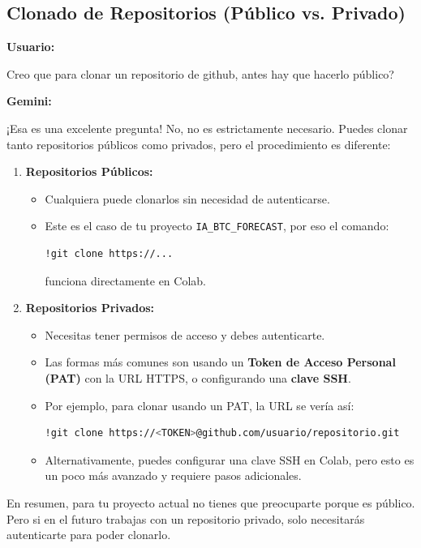 \documentclass[12pt, a4paper]{article}
\newenvironment{usuario}{\par\noindent\textbf{Usuario:}\itshape\par\ignorespaces}{\par}
\newenvironment{gemini}{\par\noindent\textbf{Gemini:}\par\ignorespaces}{\par}
\begin{document}
\subsection{Clonado de Repositorios (Público vs. Privado)}

\begin{usuario}
Creo que para clonar un repositorio de github, antes hay que 
hacerlo público?
\end{usuario}

\begin{gemini}
¡Esa es una excelente pregunta! No, no es estrictamente 
necesario. Puedes clonar tanto repositorios públicos como 
privados, pero el procedimiento es diferente:

\begin{enumerate}
    \item \textbf{Repositorios Públicos:}
    \begin{itemize}
        \item Cualquiera puede clonarlos sin necesidad de autenticarse.
        \item Este es el caso de tu proyecto \texttt{IA\_BTC\_FORECAST}, por eso el comando:
        \begin{lstlisting}[language=bash] !git clone https://...
        \end{lstlisting}
        funciona directamente en Colab.
    \end{itemize}

    \item \textbf{Repositorios Privados:}
    \begin{itemize}
        \item Necesitas tener permisos de acceso y debes autenticarte.
        \item Las formas más comunes son usando un \textbf{Token de Acceso Personal (PAT)} con la URL HTTPS, o configurando una 
        \textbf{clave SSH}.
        \item Por ejemplo, para clonar usando un PAT, la URL se vería así:
        \begin{lstlisting}[language=bash]
!git clone https://<TOKEN>@github.com/usuario/repositorio.git
        \end{lstlisting}
        \item Alternativamente, puedes configurar una clave SSH en Colab, pero esto es un poco más avanzado y requiere pasos 
        adicionales.
    \end{itemize}
\end{enumerate}

En resumen, para tu proyecto actual no tienes que preocuparte porque es público. Pero si en el futuro trabajas con un repositorio privado, solo necesitarás autenticarte para poder clonarlo.
\end{gemini}
\end{document}
